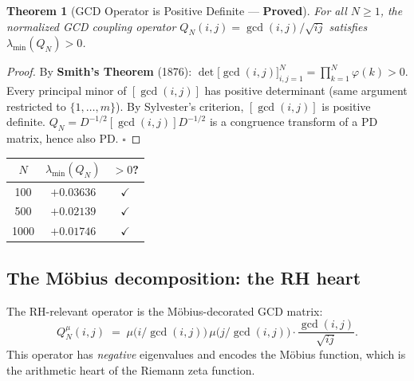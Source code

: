 \documentclass[12pt]{article}
\newtheorem{theorem}{Theorem}
\begin{document}
\begin{tcolorbox}[provedbox]
\begin{theorem}[GCD Operator is Positive Definite --- \textbf{Proved}]
\label{thm:qn-psd}
For all $N \ge 1$, the normalized GCD coupling operator $Q_N(i,j) = \gcd(i,j)/\!\sqrt{ij}$
satisfies $\lambda_{\min}(Q_N) > 0$.
\end{theorem}
\end{tcolorbox}

\begin{proof}
By \textbf{Smith's Theorem} (1876):
$\det\bigl[\gcd(i,j)\bigr]_{i,j=1}^N = \prod_{k=1}^N \varphi(k) > 0$.
Every principal minor of $[\gcd(i,j)]$ has positive determinant (same argument restricted to $\{1,\ldots,m\}$).
By Sylvester's criterion, $[\gcd(i,j)]$ is positive definite.
$Q_N = D^{-1/2}[\gcd(i,j)]D^{-1/2}$ is a congruence transform of a PD matrix, hence also PD. \hfill$\square$
\end{proof}

\begin{center}
\small
\begin{tabular}{@{}ccc@{}}
\toprule
$N$ & $\lambda_{\min}(Q_N)$ & $> 0$? \\ \midrule
 100 & $+0.03636$ & $\checkmark$ \\
 500 & $+0.02139$ & $\checkmark$ \\
1000 & $+0.01746$ & $\checkmark$ \\
\bottomrule
\end{tabular}
\end{center}

\subsection{The M\"{o}bius decomposition: the RH heart}
\label{subsec:mobius}

The RH-relevant operator is the M\"{o}bius-decorated GCD matrix:
\[
  Q_N^{\mu}(i,j) \;=\; \mu\!\bigl(i/\gcd(i,j)\bigr)\,\mu\!\bigl(j/\gcd(i,j)\bigr)
  \cdot \frac{\gcd(i,j)}{\sqrt{ij}}.
\]
This operator has \emph{negative} eigenvalues and encodes the Möbius function,
which is the arithmetic heart of the Riemann zeta function.
\end{document}
